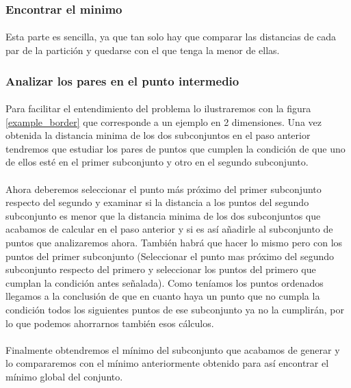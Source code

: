 \documentclass{article}
\begin{document}
		\subsubsection{Encontrar el minimo}

			\paragraph{}
			Esta parte es sencilla, ya que tan solo hay que comparar las distancias de cada par de la partición y quedarse con el que tenga la menor de ellas.

		\subsubsection{Analizar los pares en el punto intermedio}

			\paragraph{}
			Para facilitar el entendimiento del problema lo ilustraremos con la figura \ref{example_border} que corresponde a un ejemplo en 2 dimensiones. Una vez obtenida la distancia minima de los dos subconjuntos en el paso anterior tendremos que estudiar los pares de puntos que cumplen la condición de que uno de ellos esté en el primer subconjunto y otro en el segundo subconjunto.
			
			\paragraph{}
			Ahora deberemos seleccionar el punto más próximo del primer subconjunto respecto del segundo y examinar si la distancia a los puntos del segundo subconjunto es menor que la distancia minima de los dos subconjuntos  que acabamos de calcular en el paso anterior y si es así añadirle al subconjunto de puntos que analizaremos ahora. También habrá que hacer lo mismo pero con los puntos del primer subconjunto (Seleccionar el punto mas próximo del segundo subconjunto respecto del primero y seleccionar los puntos del primero que cumplan la condición antes señalada). Como teníamos los puntos ordenados llegamos a la conclusión de que en cuanto haya un punto que no cumpla la condición todos los siguientes puntos de ese subconjunto ya no la cumplirán, por lo que podemos ahorrarnos también esos cálculos.
			
			\paragraph{}
			Finalmente obtendremos el mínimo del subconjunto que acabamos de generar y lo compararemos con el mínimo anteriormente obtenido para así encontrar el mínimo global del conjunto.
\end{document}
